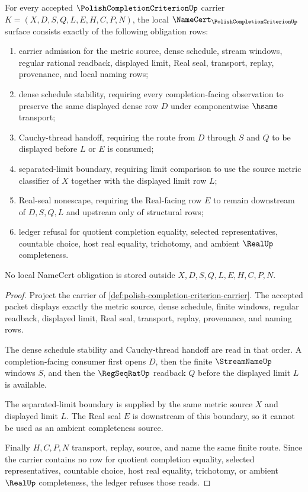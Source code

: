 \begin{theorem}
\label{thm:polish-completion-criterion-namecert-obligations}
For every accepted $\PolishCompletionCriterionUp$ carrier $K=(X,D,S,Q,L,E,H,C,P,N)$, the local $\NameCert_{\PolishCompletionCriterionUp}$ surface consists exactly of the following obligation rows:
\begin{enumerate}
\item carrier admission for the metric source, dense schedule, stream windows, regular rational readback, displayed limit, Real seal, transport, replay, provenance, and local naming rows;
\item dense schedule stability, requiring every completion-facing observation to preserve the same displayed dense row $D$ under componentwise $\hsame$ transport;
\item Cauchy-thread handoff, requiring the route from $D$ through $S$ and $Q$ to be displayed before $L$ or $E$ is consumed;
\item separated-limit boundary, requiring limit comparison to use the source metric classifier of $X$ together with the displayed limit row $L$;
\item Real-seal nonescape, requiring the Real-facing row $E$ to remain downstream of $D,S,Q,L$ and upstream only of structural rows;
\item ledger refusal for quotient completion equality, selected representatives, countable choice, host real equality, trichotomy, and ambient $\RealUp$ completeness.
\end{enumerate}
No local NameCert obligation is stored outside $X,D,S,Q,L,E,H,C,P,N$.
\end{theorem}
\begin{proof}
Project the carrier of \autoref{def:polish-completion-criterion-carrier}. The accepted packet displays exactly the metric source, dense schedule, finite windows, regular readback, displayed limit, Real seal, transport, replay, provenance, and naming rows.

The dense schedule stability and Cauchy-thread handoff are read in that order. A completion-facing consumer first opens $D$, then the finite $\StreamNameUp$ windows $S$, and then the $\RegSeqRatUp$ readback $Q$ before the displayed limit $L$ is available.

The separated-limit boundary is supplied by the same metric source $X$ and displayed limit $L$. The Real seal $E$ is downstream of this boundary, so it cannot be used as an ambient completeness source.

Finally $H,C,P,N$ transport, replay, source, and name the same finite route. Since the carrier contains no row for quotient completion equality, selected representatives, countable choice, host real equality, trichotomy, or ambient $\RealUp$ completeness, the ledger refuses those reads.
\end{proof}

